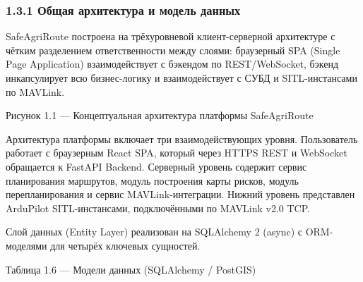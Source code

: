 \documentclass[14pt,a4paper]{extarticle}
\begin{document}
\hypertarget{ux43eux431ux449ux430ux44f-ux430ux440ux445ux438ux442ux435ux43aux442ux443ux440ux430-ux438-ux43cux43eux434ux435ux43bux44c-ux434ux430ux43dux43dux44bux445}{%
\subsubsection{1.3.1 Общая архитектура и модель данных}\label{ux43eux431ux449ux430ux44f-ux430ux440ux445ux438ux442ux435ux43aux442ux443ux440ux430-ux438-ux43cux43eux434ux435ux43bux44c-ux434ux430ux43dux43dux44bux445}}

SafeAgriRoute построена на трёхуровневой клиент-серверной архитектуре с чётким разделением ответственности между слоями: браузерный SPA (Single Page Application) взаимодействует с бэкендом по REST/WebSocket, бэкенд инкапсулирует всю бизнес-логику и взаимодействует с СУБД и SITL-инстансами по MAVLink.

Рисунок 1.1 --- Концептуальная архитектура платформы SafeAgriRoute

Архитектура платформы включает три взаимодействующих уровня. Пользователь работает с браузерным React SPA, который через HTTPS REST и WebSocket обращается к FastAPI Backend. Серверный уровень содержит сервис планирования маршрутов, модуль построения карты рисков, модуль перепланирования и сервис MAVLink-интеграции. Нижний уровень представлен ArduPilot SITL-инстансами, подключёнными по MAVLink v2.0 TCP.


Слой данных (Entity Layer) реализован на SQLAlchemy 2 (async) с ORM-моделями для четырёх ключевых сущностей.

Таблица 1.6 --- Модели данных (SQLAlchemy / PostGIS)
\end{document}
